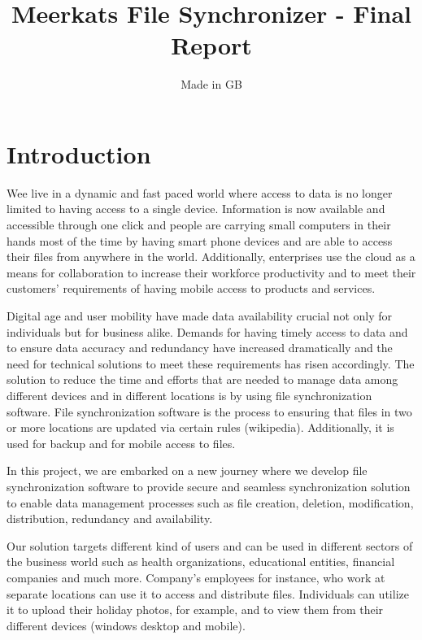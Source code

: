 \documentclass{article}
\title{Meerkats File Synchronizer - Final Report}
\author{Made in GB}
\date{}
\begin{document}
\maketitle{}

\tableofcontents
\newpage

\section{Introduction}
Wee live in a dynamic and fast paced world where access to data is no longer limited to having access to a single device. Information is now available and accessible through one click and people are carrying small computers in their hands most of the time by having smart phone devices and are able to access their files from anywhere in the world. Additionally, enterprises use the cloud as a means for collaboration to increase their workforce productivity and to meet their customers’ requirements of having mobile access to products and services.

Digital age and user mobility have made data availability crucial not only for individuals but for business alike. Demands for having timely access to data and to ensure data accuracy and redundancy have increased dramatically and the need for technical solutions to meet these requirements has risen accordingly. The solution to reduce the time and efforts that are needed to manage data among different devices and in different locations is by using file synchronization software. File synchronization software is the process to ensuring that files in two or more locations are updated via certain rules (wikipedia). Additionally, it is used for backup and for mobile access to files.


\hfill \break
In this project, we are embarked on a new journey where we develop file synchronization software to provide secure and seamless synchronization solution to enable data management processes such as file creation, deletion, modification, distribution, redundancy and availability.

Our solution targets different kind of users and can be used in different sectors of the business world such as health organizations, educational entities, financial companies and much more. Company’s employees for instance, who work at separate locations can use it to access and distribute files. Individuals can utilize it to upload their holiday photos, for example, and to view them from their different devices (windows desktop and mobile).
\end{document}
